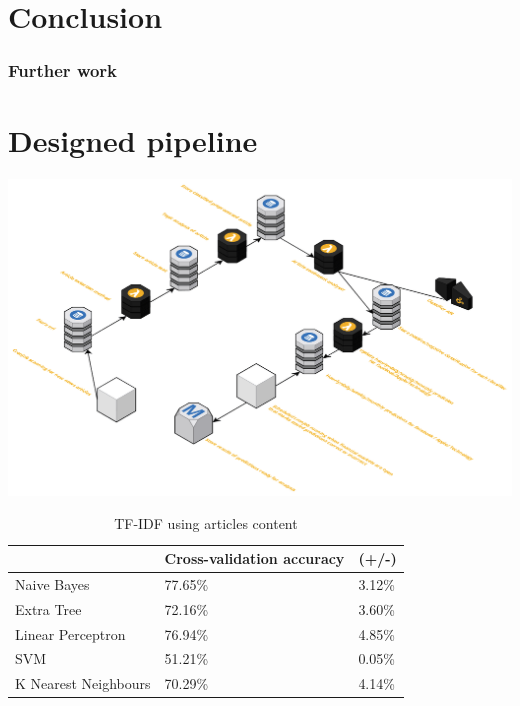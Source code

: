 \documentclass[a4paper,11pt]{report}
\begin{document}
\chapter{Conclusion}
\label{chap:conclusion}

\subsection{Further work}



\clearpage
{}
{}



\appendix
\chapter{Designed pipeline}
\includegraphics[scale=0.5, angle=90]{pipeline.png}

\begin{table}[h!]
\centering
\caption{TF-IDF using articles content}
\label{tfidf-article-contents}
\begin{tabular}{|l|l|l|}
\hline
                     & Cross-validation accuracy & (+/-)  \\ \hline
Naive Bayes          & 77.65\%                   & 3.12\% \\ \hline
Extra Tree           & 72.16\%                   & 3.60\% \\ \hline
Linear Perceptron    & 76.94\%                   & 4.85\% \\ \hline
SVM                  & 51.21\%                   & 0.05\% \\ \hline
K Nearest Neighbours & 70.29\%                   & 4.14\% \\ \hline
\end{tabular}
\end{table}
\end{document}
